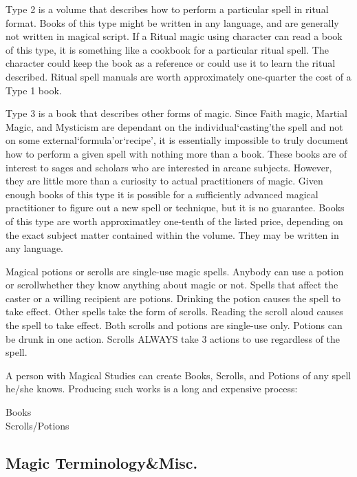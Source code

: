 \documentclass[twoside]{book}
\begin{document}
    {  
    Type 2 is a volume that describes how to perform a particular spell in ritual format. Books of this type might be written in any language, and are generally not written in magical script. If a Ritual magic using character can read a book of this type, it is something like a cookbook for a particular ritual spell. The character could keep the book as a reference or could use it to learn the ritual described. Ritual spell manuals are worth approximately one-quarter the cost of a Type 1 book.
    }
  
    {  
    Type 3 is a book that describes other forms of magic. Since Faith magic, Martial Magic, and Mysticism are dependant on the individual`casting'the spell and not on some external`formula'or`recipe', it is essentially impossible to truly document how to perform a given spell with nothing more than a book. These books are of interest to sages and scholars who are interested in arcane subjects. However, they are little more than a curiosity to actual practitioners of magic. Given enough books of this type it is possible for a sufficiently advanced magical practitioner to figure out a new spell or technique, but it is no guarantee. Books of this type are worth approximatley one-tenth of the listed price, depending on the exact subject matter contained within the volume. They may be written in any language.
    }
  
    {  
    Magical potions or scrolls are single-use magic spells. Anybody can use a potion or scrollwhether they know anything about magic or not. Spells that affect the caster or a willing recipient are potions. Drinking the potion causes the spell to take effect. Other spells take the form of scrolls. Reading the scroll aloud causes the spell to take effect. Both scrolls and potions are single-use only. Potions can be drunk in one action. Scrolls ALWAYS take 3 actions to use regardless of the spell.
    }
  
    {  
    A person with Magical Studies can create Books, Scrolls, and Potions of any spell he/she knows. Producing such works is a long and expensive process:
    }
  
\begin{description}
    
  \item[Books] 
  \item[Scrolls/Potions] 
\end{description}
  
    

\subsection{Magic Terminology\&Misc.}
    
\end{document}

